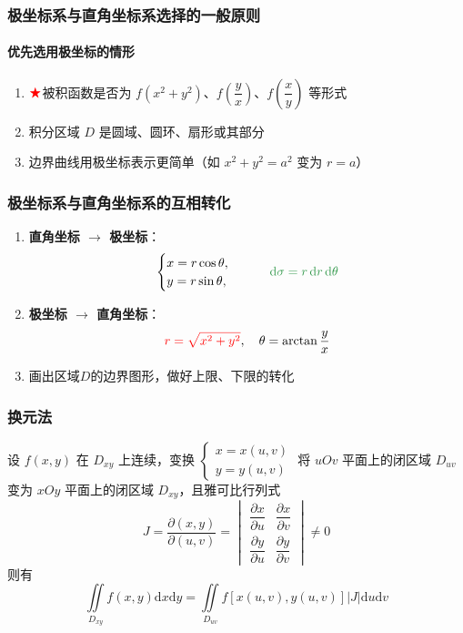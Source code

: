 \documentclass[../book.tex]{subfiles}
\begin{document}
    \subsubsection{极坐标系与直角坐标系选择的一般原则}

    \paragraph{优先选用极坐标的情形}
    \begin{enumerate}
        \item $\color{red}{\bigstar}$被积函数是否为 $f(x^2 + y^2)$、$f(\dfrac{y}{x})$、$f(\dfrac{x}{y})$ 等形式
        \item 积分区域 $D$ 是圆域、圆环、扇形或其部分
        \item 边界曲线用极坐标表示更简单（如 $x^2 + y^2 = a^2$ 变为 $r = a$）
    \end{enumerate}

    \subsubsection{极坐标系与直角坐标系的互相转化}

    \begin{enumerate}
        \item \textbf{直角坐标 $\to$ 极坐标}：
        \[
            \begin{cases}
                x = r\cos\theta, \\
                y = r\sin\theta,
            \end{cases}
            \qquad \gmath{\mathrm{d}\sigma = r\,\mathrm{d}r\,\mathrm{d}\theta}
        \]

        \item \textbf{极坐标 $\to$ 直角坐标}：
        \[
            {\color{red}{r = \sqrt{x^2 + y^2}}}, \quad \theta = \arctan\frac{y}{x}
        \]
        \item 画出区域$D$的边界图形，做好上限、下限的转化
    \end{enumerate}

    \subsubsection{换元法}

    设 $f(x,y)$ 在 $D_{xy}$ 上连续，变换 $\begin{cases}
                                             x = x(u,v) \\ y = y(u,v)
    \end{cases}$ 将 $uOv$ 平面上的闭区域 $D_{uv}$ 变为 $xOy$ 平面上的闭区域 $D_{xy}$，且雅可比行列式
    \[
        J = \frac{\partial(x,y)}{\partial(u,v)} = \begin{vmatrix}
                                                      \dfrac{\partial x}{\partial u} & \dfrac{\partial x}{\partial v} \\[6pt]
                                                      \dfrac{\partial y}{\partial u} & \dfrac{\partial y}{\partial v}
        \end{vmatrix} \neq 0
    \]
    则有
    \[
        \iint\limits_{D_{xy}} f(x,y) \mathrm{d}x\mathrm{d}y = \iint\limits_{D_{uv}} f[x(u,v), y(u,v)] |J| \mathrm{d}u\mathrm{d}v
    \]
\end{document}
